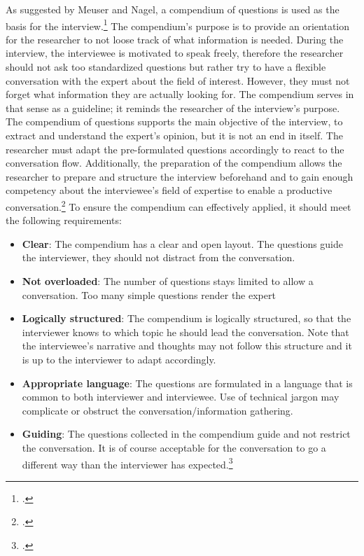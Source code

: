 As suggested by Meuser and Nagel, a compendium of questions is used as the basis for the interview.\footcite[Cf.][p.472]{MeuserExperteninterviewkonzeptionelleGrundlagen2009} The compendium's purpose is to provide an orientation for the researcher to not loose track of what information is needed. During the interview, the interviewee is motivated to speak freely, therefore the researcher should not ask too standardized questions but rather try to have a flexible conversation with the expert about the field of interest. However, they must not forget what information they are actually looking for. The compendium serves in that sense as a guideline; it reminds the researcher of the interview's purpose. The compendium of questions supports the main objective of the interview, to extract and understand the expert's opinion, but it is not an end in itself. The researcher must adapt the pre-formulated questions accordingly to react to the conversation flow. Additionally, the preparation of the compendium allows the researcher to prepare and structure the interview beforehand and to gain enough competency about the interviewee's field of expertise to enable a productive conversation.\footcites[Cf.][p.472 et seqq]{MeuserExperteninterviewkonzeptionelleGrundlagen2009}[cf.][p.133]{KrugerMethodennaturwissenschaftsdidaktischenForschung2014}[cf.][p.431 et seq]{BognerInterviewsmitExperten2014}[cf.][p.123 et seqq]{NiebertLeitfadengestutzteInterviews2014}[cf.][p.421]{AghamanoukjanQualitativeInterviews2007}
To ensure the compendium can effectively applied, it should meet the following requirements: 
\begin{itemize}
    \item \textbf{Clear}: The compendium has a clear and open layout. The questions guide the interviewer, they should not distract from the conversation.
    \item \textbf{Not overloaded}: The number of questions stays limited to allow a conversation. Too many simple questions render the expert 
    \item \textbf{Logically structured}: The compendium is logically structured, so that the interviewer knows to which topic he should lead the conversation. Note that the interviewee's narrative and thoughts may not follow this structure and it is up to the interviewer to adapt accordingly.
    \item \textbf{Appropriate language}: The questions are formulated in a language that is common to both interviewer and interviewee. Use of technical jargon may complicate or obstruct the conversation/information gathering.
    \item \textbf{Guiding}: The questions collected in the compendium guide and not restrict the conversation. It is of course acceptable for the conversation to go a different way than the interviewer has expected.\footcite[Cf.][p.126]{NiebertLeitfadengestutzteInterviews2014}
\end{itemize}

